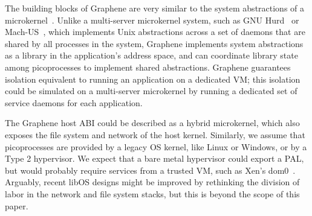 \vspace{5pt}
The building blocks of Graphene are very similar to the system abstractions of a 
microkernel~\cite{liedtke95sosp,klein09sel4,elphinstone13microkernels,liedtke93sosp,chen93memory,Baron:1985:MOE,Accetta:1986:MNK}.
Unlike a multi-server microkernel system, such as GNU Hurd~\cite{hurd} or Mach-US~\cite{stevenson95mach-us},
which implements Unix abstractions across a set of daemons that are shared by all processes in the system,
Graphene implements system abstractions as a library in the application's address space,
and can coordinate library state among picoprocesses to implement shared abstractions.
Graphene guarantees isolation equivalent to running 
an application on a dedicated VM; this isolation could be simulated on a multi-server microkernel
by running a dedicated set of service daemons for each application.


The Graphene host ABI could be described as a hybrid microkernel,
which also exposes the file system and network of the host kernel.
Similarly, we assume that picoprocesses are provided by a legacy OS kernel, like Linux or Windows,
or by a Type 2 hypervisor.  We expect that a bare metal hypervisor could export a PAL,
but would probably require services from a trusted VM, such as Xen's dom0~\cite{barham03xen}.
Arguably, recent libOS designs might be improved by rethinking the division of labor in
the network and file system stacks, but this is beyond the scope of this paper.

